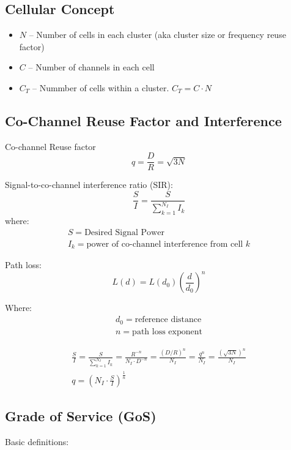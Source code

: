 \subsection{Cellular Concept}
\begin{itemize}
    \item $N$ -- Number of cells in each cluster (aka cluster size or frequency reuse factor)
    \item $C$ -- Number of channels in each cell
    \item $C_T$ -- Nummber of cells within a cluster. $C_T = C \cdot N$
\end{itemize}

\subsection{Co-Channel Reuse Factor and Interference}
Co-channel Reuse factor
\begin{equation}
    q = \frac{D}{R} = \sqrt{3N}
\end{equation}

Signal-to-co-channel interference ratio (SIR):
\begin{equation}
    \frac{S}{I} = \frac{S}{\sum_{k=1}^{N_I} I_k}
\end{equation}
where:
\begin{gather*}
    S = \text{Desired Signal Power} \\
    I_k = \text{power of co-channel interference from cell $k$}
\end{gather*}

Path loss:
\begin{equation}
    L(d) = L(d_0) \left( \frac{d}{d_0} \right)^n
\end{equation}

Where:
\begin{gather*}
    d_0 = \text{reference distance}\\
    n = \text{path loss exponent}
\end{gather*}

\begin{gather}
    \frac{S}{I} = \frac{S}{\sum_{k=1}^{N_I} I_k} = \frac{R^{-n}}{N_I \cdot D^{-n}} = \frac{(D/R)^n}{N_I}
    = \frac{q^n}{N_I} = \frac{(\sqrt{3N})^n}{N_I} \\
    \boxed{q = \left(N_I \cdot \frac{S}{I}\right)^{\frac{1}{n}}}
\end{gather}

\subsection{Grade of Service (GoS)}
Basic definitions:

